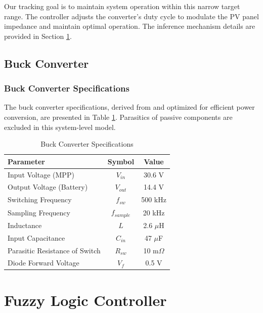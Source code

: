 \documentclass[conference]{IEEEtran}
\begin{document}
Our tracking goal is to maintain 
system operation within this narrow target range. 
The controller adjusts the converter's 
duty cycle to modulate the PV panel impedance 
and maintain optimal operation. The inference 
mechanism details are provided in 
Section \ref{sec:fuzzy_controller}.

\subsection{Buck Converter}
\label{subsec:buck_converter}

\subsubsection{Buck Converter Specifications}
\label{subsec:buck_specs}

The buck converter specifications, derived from \cite{EricksonBook,RashidBook,TIReport} and optimized for efficient power conversion, are presented in Table \ref{tab:buck_converter_specs}. Parasitics of passive components are excluded in this system-level model.

\begin{table}[ht]
\centering
\caption{Buck Converter Specifications}
\label{tab:buck_converter_specs}
\begin{tabular}{|l|c|c|}
\hline
\textbf{Parameter} & \textbf{Symbol} & \textbf{Value} \\
\hline
Input Voltage (MPP) & $V_{in}$ & 30.6 V \\
\hline
Output Voltage (Battery) & $V_{out}$ & 14.4 V \\
\hline
Switching Frequency & $f_{sw}$ & 500 kHz \\
\hline
Sampling Frequency & $f_{sample}$ & 20 kHz \\
\hline
Inductance & $L$ & 2.6 $\mu$H \\
\hline
Input Capacitance & $C_{in}$ & 47 $\mu$F \\
\hline
Parasitic Resistance of Switch & $R_{sw}$ & 10 m$\Omega$ \\
\hline
Diode Forward Voltage & $V_f$ & 0.5 V \\
\hline
\end{tabular}
\end{table}

\section{Fuzzy Logic Controller}
\label{sec:fuzzy_controller}
\end{document}
